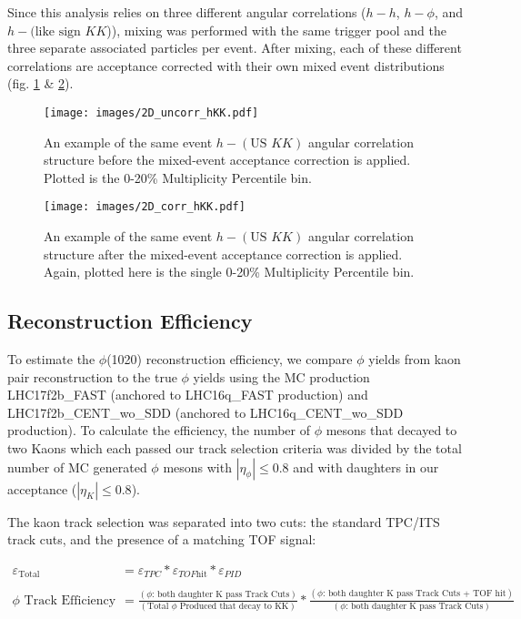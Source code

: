 \documentclass[ALICE,manyauthors]{ALICE_analysis_notes}
\begin{document}
Since this analysis relies on three different angular correlations ($h-h$, $h-\phi$, and $h-(\text{like sign } KK$)), mixing was performed with the same trigger pool and the three separate associated particles per event.  After mixing, each of these different correlations are acceptance corrected with their own mixed event distributions (fig. \ref{uncorr2D} \& \ref{corr2D}).


\begin{figure}[ht]
\centering
\texttt{[image: images/2D\_uncorr\_hKK.pdf]}
\caption{An example of the same event $h-(\text{US }KK)$ angular correlation structure before the mixed-event acceptance correction is applied.  Plotted is the 0-20\% Multiplicity Percentile bin.}
\label{uncorr2D}
\end{figure}

\begin{figure}[ht]
\centering
\texttt{[image: images/2D\_corr\_hKK.pdf]}
\caption{An example of the same event $h-(\text{US }KK)$ angular correlation structure after the mixed-event acceptance correction is applied.  Again, plotted here is the single 0-20\% Multiplicity Percentile bin.}
\label{corr2D}
\end{figure}

\subsection{Reconstruction Efficiency}
To estimate the $\phi$(1020) reconstruction efficiency, we compare $\phi$ yields from kaon pair reconstruction to the true $\phi$ yields using the MC production LHC17f2b\_FAST (anchored to LHC16q\_FAST production) and LHC17f2b\_CENT\_wo\_SDD (anchored to LHC16q\_CENT\_wo\_SDD production). To calculate the efficiency, the number of $\phi$ mesons that decayed to two Kaons which each passed our track selection criteria was divided by the total number of MC generated $\phi$ mesons with $|\eta_{\phi}| \leq 0.8$ and with daughters in our acceptance ($|\eta_{K}| \leq 0.8$).

The kaon track selection was separated into two cuts: the standard TPC/ITS track cuts, and the presence of a matching TOF signal:

\begin{align*}
    \varepsilon_{\text{Total}} &= \varepsilon_{TPC}*\varepsilon_{TOF\text{hit}}*\varepsilon_{PID}\\
    \\
    \phi\text{ Track Efficiency } &= \frac{(\phi\text{: both daughter K pass Track Cuts})}{(\text{Total }\phi\text{ Produced that decay to KK})} * \frac{(\phi\text{: both daughter K pass Track Cuts + TOF hit})}{(\phi\text{: both daughter K pass Track Cuts})}
\end{align*}
\end{document}
